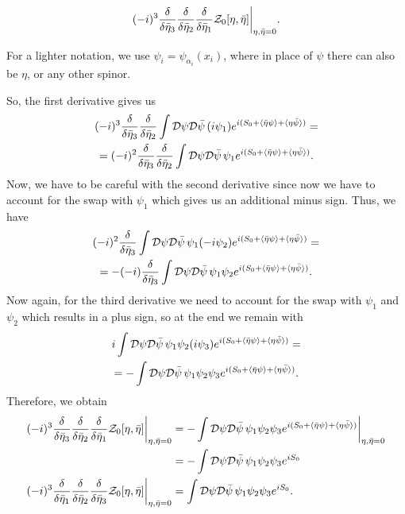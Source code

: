 \begin{equation}
    (-i)^3\frac{\delta}{\delta\bar{\eta}_3}\frac{\delta}{\delta\bar{\eta}_2}\frac{\delta}{\delta\bar{\eta}_1}\mathcal{Z}_0[\eta,\bar{\eta}]\bigg|_{\eta,\bar{\eta} = 0}.
\end{equation}
\begin{notz}
    For a lighter notation, we use $\psi_i = \psi_{\alpha_i}(x_i)$, where in place of $\psi$ there can also be $\eta$, or any other spinor.
\end{notz}
So, the first derivative gives us 
\begin{multline}
    (-i)^3\frac{\delta}{\delta\bar{\eta}_3}\frac{\delta}{\delta\bar{\eta}_2}\int \mathcal{D}\psi\mathcal{D}\bar{\psi}\,(i\psi_1)e^{i(S_0 + \langle \bar{\eta}\psi \rangle + \langle \eta\bar{\psi} \rangle)} = \\ 
    = (-i)^2\frac{\delta}{\delta\bar{\eta}_3}\frac{\delta}{\delta\bar{\eta}_2}\int \mathcal{D}\psi\mathcal{D}\bar{\psi}\,\psi_1e^{i(S_0 + \langle \bar{\eta}\psi \rangle + \langle \eta\bar{\psi} \rangle)}.
\end{multline}
Now, we have to be careful with the second derivative since now we have to account for the swap with $\psi_1$ which gives us an additional minus sign. Thus, we have 
\begin{multline}
    (-i)^2\frac{\delta}{\delta\bar{\eta}_3}\int \mathcal{D}\psi\mathcal{D}\bar{\psi}\,\psi_1(-i\psi_2)e^{i(S_0 + \langle \bar{\eta}\psi \rangle + \langle \eta\bar{\psi} \rangle)} = \\ 
    = -(-i)\frac{\delta}{\delta\bar{\eta}_3}\int \mathcal{D}\psi\mathcal{D}\bar{\psi}\,\psi_1\psi_2e^{i(S_0 + \langle \bar{\eta}\psi \rangle + \langle \eta\bar{\psi} \rangle)}.
\end{multline}
Now again, for the third derivative we need to account for the swap with $\psi_1$ and $\psi_2$ which results in a plus sign, so at the end we remain with 
\begin{multline}
    i\int \mathcal{D}\psi\mathcal{D}\bar{\psi}\,\psi_1\psi_2(i\psi_3)e^{i(S_0 + \langle \bar{\eta}\psi \rangle + \langle \eta\bar{\psi} \rangle)} = \\
    = -\int \mathcal{D}\psi\mathcal{D}\bar{\psi}\,\psi_1\psi_2\psi_3e^{i(S_0 + \langle \bar{\eta}\psi \rangle + \langle \eta\bar{\psi} \rangle)}.
\end{multline}
Therefore, we obtain 
\begin{equation}
    \begin{split}
        (-i)^3\frac{\delta}{\delta\bar{\eta}_3}\frac{\delta}{\delta\bar{\eta}_2}\frac{\delta}{\delta\bar{\eta}_1}\mathcal{Z}_0[\eta,\bar{\eta}]\bigg|_{\eta,\bar{\eta} = 0} &= -\int \mathcal{D}\psi\mathcal{D}\bar{\psi}\,\psi_1\psi_2\psi_3e^{i(S_0 + \langle \bar{\eta}\psi \rangle + \langle \eta\bar{\psi} \rangle)}\bigg|_{\eta,\bar{\eta} = 0} \\
        &= -\int \mathcal{D}\psi\mathcal{D}\bar{\psi}\,\psi_1\psi_2\psi_3e^{iS_0} \\
        (-i)^3\frac{\delta}{\delta\bar{\eta}_1}\frac{\delta}{\delta\bar{\eta}_2}\frac{\delta}{\delta\bar{\eta}_3}\mathcal{Z}_0[\eta,\bar{\eta}]\bigg|_{\eta,\bar{\eta} = 0} &= \int \mathcal{D}\psi\mathcal{D}\bar{\psi}\,\psi_1\psi_2\psi_3e^{iS_0}.
    \end{split}
\end{equation}
